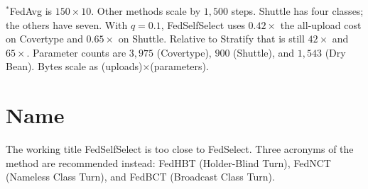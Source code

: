 \documentclass[11pt,a4paper]{article}
\theoremstyle{plain}
\begin{document}
\noindent
$^*$FedAvg is $150\times 10$. Other methods scale by $1{,}500$ steps. Shuttle has four classes; the others have seven. With $q{=}0.1$, FedSelfSelect uses $0.42\times$ the all-upload cost on Covertype and $0.65\times$ on Shuttle. Relative to Stratify that is still $42\times$ and $65\times$. Parameter counts are $3{,}975$ (Covertype), $900$ (Shuttle), and $1{,}543$ (Dry Bean). Bytes scale as (uploads)$\times$(parameters).

\section{Name}

The working title FedSelfSelect is too close to FedSelect. Three acronyms of the method are recommended instead: FedHBT (Holder-Blind Turn), FedNCT (Nameless Class Turn), and FedBCT (Broadcast Class Turn).
\end{document}
